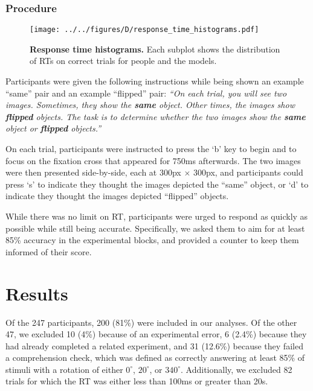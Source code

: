 \documentclass[10pt,letterpaper]{article}
\begin{document}
\subsubsection{Procedure}

\begin{figure*}[t]
  \begin{center}
    \texttt{[image: ../../figures/D/response\_time\_histograms.pdf]}
    \caption{\textbf{Response time histograms.} Each subplot shows the
      distribution of RTs on correct trials for people and the
      models.}
    \label{fig:histograms}
  \end{center}
\end{figure*}

Participants were given the following instructions while being shown
an example ``same'' pair and an example ``flipped'' pair: \textit{``On
  each trial, you will see two images. Sometimes, they show the
  \textbf{same} object. Other times, the images show \textbf{flipped}
  objects. The task is to determine whether the two images show the
  \textbf{same} object or \textbf{flipped} objects.''}

On each trial, participants were instructed to press the `b' key to
begin and to focus on the fixation cross that appeared for 750ms
afterwards. The two images were then presented side-by-side, each at
300px $\times$ 300px, and participants could press `s' to indicate
they thought the images depicted the ``same'' object, or `d' to
indicate they thought the images depicted ``flipped'' objects.

While there was no limit on RT, participants were urged to respond as
quickly as possible while still being accurate. Specifically, we asked
them to aim for at least 85\% accuracy in the experimental blocks, and
provided a counter to keep them informed of their score.

\section{Results}

Of the 247 participants, 200 (81\%) were included in our analyses. Of
the other 47, we excluded 10 (4\%) because of an experimental error, 6
(2.4\%) because they had already completed a related experiment, and
31 (12.6\%) because they failed a comprehension check, which was
defined as correctly answering at least 85\% of stimuli with a
rotation of either $0^\circ$, $20^\circ$, or $340^\circ$.
Additionally, we excluded 82 trials for which the RT was either less
than 100ms or greater than 20s.
\end{document}

